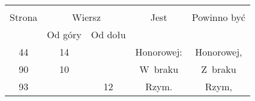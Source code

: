 \documentclass[a4paper,11pt]{article}
\numberwithin{equation}{section}
\begin{document}
\begin{center}

  \begin{tabular}{|c|c|c|c|c|}
    \hline
    & \multicolumn{2}{c|}{} & & \\
    Strona & \multicolumn{2}{c|}{Wiersz} & Jest
                              & Powinno być \\ \cline{2-3}
    & Od góry & Od dołu & & \\
    \hline
    44  & 14 & & Honorowej: & Honorowej, \\
    90  & 10 & & W~braku & Z~braku \\
    93  & & 12 & Rzym. & Rzym, \\
    \hline
  \end{tabular}

\end{center}


\VerSpaceTwo











\printbibliography





\end{document}
